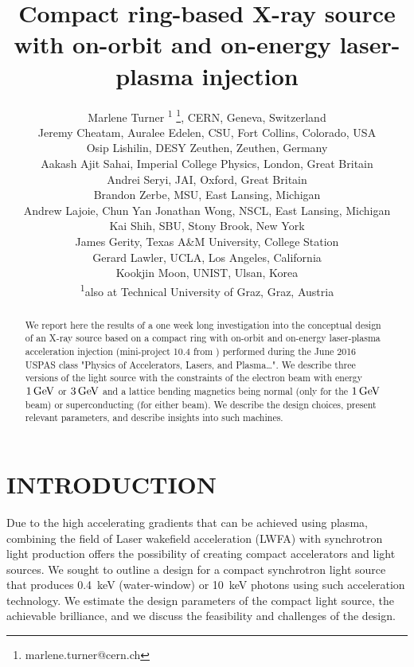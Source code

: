 \documentclass[a4paper,
              ]{jacow}
\begin{document}
\title{Compact ring-based X-ray source with
on-orbit and on-energy laser-plasma
injection}

\author{Marlene Turner \textsuperscript{1} \thanks{marlene.turner@cern.ch}, CERN, Geneva, Switzerland\\
Jeremy Cheatam, Auralee Edelen, CSU, Fort Collins, Colorado, USA \\
Osip Lishilin, DESY Zeuthen, Zeuthen, Germany\\
Aakash Ajit Sahai, Imperial College Physics, London, Great Britain\\
Andrei Seryi, JAI, Oxford, Great Britain\\
Brandon Zerbe, MSU, East Lansing, Michigan\\
Andrew Lajoie, Chun Yan Jonathan Wong, NSCL, East Lansing, Michigan\\
Kai Shih, SBU, Stony Brook, New York\\
James Gerity, Texas A\&M University, College Station\\
Gerard Lawler, UCLA, Los Angeles, California\\
Kookjin Moon, UNIST, Ulsan, Korea\\
		\textsuperscript{1}also at Technical University of Graz, Graz, Austria}
	
\maketitle

%
\begin{abstract}
We report here the results of a one week long investigation into the conceptual design of an X-ray source based on a compact ring with on-orbit and on-energy laser-plasma acceleration injection (mini-project 10.4 from \cite{UNIFYINGPHYSICS}) performed during the June 2016 USPAS class "Physics of Accelerators, Lasers, and Plasma\ldots". We describe three versions of the light source with the constraints of the electron beam with energy $1\,\rm{GeV}$ or $3\,\rm{GeV}$ and a lattice bending magnetics being normal (only for the $1\,\rm{GeV}$ beam) or superconducting (for either beam).  We describe the design choices, present relevant parameters, and describe insights into such machines.
\end{abstract}


\section{INTRODUCTION}

Due to the high accelerating gradients that can be achieved using plasma, combining the field of Laser wakefield acceleration (LWFA) with synchrotron light production offers the possibility of creating compact accelerators and light sources.
We sought to outline a design for a compact synchrotron light source that produces \SI{0.4}{keV} (water-window) or \SI{10}{keV} photons using such acceleration technology. We estimate the design parameters of the compact light source, the achievable brilliance, and we discuss the feasibility and challenges of the design. 
\end{document}
